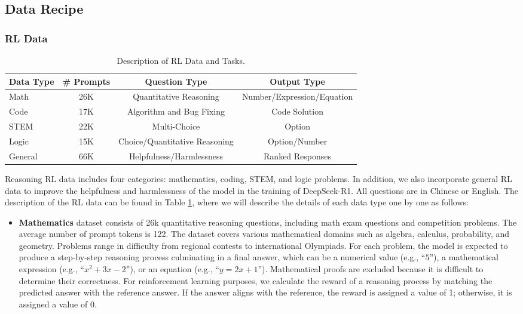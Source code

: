 \documentclass[11pt, a4paper, logo, copyright, nonumbering]{deepseek}
\newcommand{\dsri}{DeepSeek-R1}
\begin{document}
\begin{CJK*}{UTF8}{gbsn}
\subsection{Data Recipe} \label{sec:rej_sample}
\subsubsection{RL Data} \label{sec: rl_data}
\begin{table}[t]
    \centering
    \setlength{\tabcolsep}{6pt}
    
    \caption{
    Description of RL Data  and Tasks.
    }
    \label{tab:rl_data}
    \begin{tabular}{l | c| c | c}
        \toprule
        \textbf{Data Type} & \textbf{\# Prompts} & \textbf{Question Type} & \textbf{Output Type} \\
        \midrule
        Math & 26K & Quantitative Reasoning & Number/Expression/Equation \\
        Code & 17K & Algorithm and Bug Fixing & Code Solution\\
        STEM & 22K & Multi-Choice & Option \\
        Logic & 15K & Choice/Quantitative Reasoning & Option/Number \\
        General & 66K & Helpfulness/Harmlessness & Ranked Responses \\
        \bottomrule
    \end{tabular}
\end{table}

Reasoning RL data includes four categories: mathematics, coding, STEM, and logic problems. In addition, we also incorporate general RL data to improve the helpfulness and harmlessness of the model in the training of \dsri{}. All questions are in Chinese or English. The description of the RL data can be found in Table \ref{tab:rl_data}, where we will describe the details of each data type one by one as follows:

\begin{itemize}
\item \textbf{Mathematics} dataset consists of 26k quantitative reasoning questions, including math exam questions and competition problems. The average number of prompt tokens is 122. The dataset covers various mathematical domains such as algebra, calculus, probability, and geometry. Problems range in difficulty from regional contests to international Olympiads.
For each problem, the model is expected to produce a step-by-step reasoning process culminating in a final answer, which can be a numerical value (e.g., ``$5$''), a mathematical expression (e.g., ``$x^2 + 3x - 2$''), or an equation (e.g., ``$y = 2x + 1$''). Mathematical proofs are excluded because it is difficult to determine their correctness.
For reinforcement learning purposes, we calculate the reward of a reasoning process by matching the predicted answer with the reference answer. If the answer aligns with the reference, the reward is assigned a value of 1; otherwise, it is assigned a value of 0.


\end{itemize}
\end{CJK*}
\end{document}
